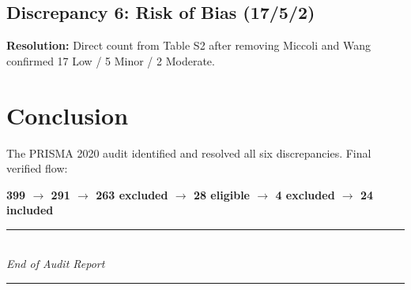 \documentclass[11pt, a4paper]{article}
\begin{document}
\subsection{Discrepancy 6: Risk of Bias (17/5/2)}

\textbf{Resolution:} Direct count from Table S2 after removing Miccoli and Wang confirmed 17 Low / 5 Minor / 2 Moderate.

\section{Conclusion}

The PRISMA 2020 audit identified and resolved all six discrepancies. Final verified flow:

\begin{center}
\Large
\textbf{399 $\rightarrow$ 291 $\rightarrow$ 263 excluded $\rightarrow$ 28 eligible $\rightarrow$ 4 excluded $\rightarrow$ 24 included}
\end{center}

\begin{center}
\rule{0.5\textwidth}{0.5pt} \\
\textit{End of Audit Report} \\
\rule{0.5\textwidth}{0.5pt}
\end{center}
\end{document}
